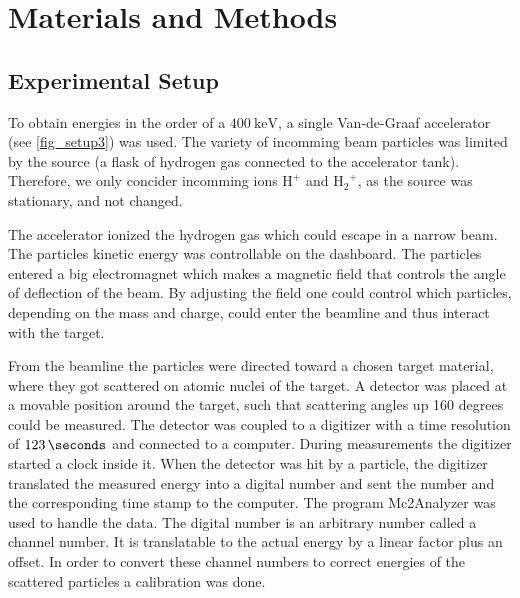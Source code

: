 \section{Materials and Methods}
\subsection{Experimental Setup}
To obtain energies in the order of a $\SI{400}{\kilo\electronvolt}$, a single Van-de-Graaf
accelerator (see \cref{fig_setup3}) was used. The variety of incomming beam particles
was limited by the source (a flask of hydrogen gas connected to the accelerator
tank). Therefore, we only concider incomming ions $\mathrm{H^+}$ and
$\mathrm{{H_{2}}^{+}}$, as the source was stationary, and not changed.

The accelerator ionized the hydrogen gas which could escape in a narrow beam.
The particles kinetic energy was controllable on the dashboard. The particles entered a big electromagnet which makes a magnetic field that controls the angle of deflection of the beam. By adjusting the field one could control which particles, depending on the mass and charge, could enter the beamline and thus interact with the target. 

From the beamline the particles were directed toward a chosen target material, where they got scattered on atomic nuclei of the target. A detector was placed at a movable position around the target, such that scattering angles up 160 degrees could be measured. 
The detector was coupled to a digitizer with a time resolution of
$\SI{123}{\seconds}$  and  connected to a computer. During measurements the digitizer started a clock inside it. When the detector was hit by a particle, the digitizer translated the measured energy into a digital number and sent the number and the corresponding time stamp to the computer. 
The program Mc2Analyzer was used to handle the data. The digital number is an arbitrary number called a channel number. It is translatable to the actual energy by a linear factor plus an offset. In order to convert these channel numbers to correct energies of the scattered particles a calibration was done.


